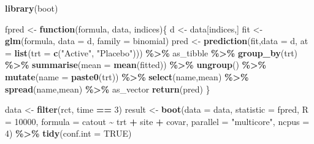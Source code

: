 \documentclass[
]{book}
\newenvironment{Shaded}{\begin{snugshade}}{\end{snugshade}}
\newcommand{\AttributeTok}[1]{\textcolor[rgb]{0.13,0.29,0.53}{#1}}
\newcommand{\ConstantTok}[1]{\textcolor[rgb]{0.56,0.35,0.01}{#1}}
\newcommand{\ControlFlowTok}[1]{\textcolor[rgb]{0.13,0.29,0.53}{\textbf{#1}}}
\newcommand{\DecValTok}[1]{\textcolor[rgb]{0.00,0.00,0.81}{#1}}
\newcommand{\FunctionTok}[1]{\textcolor[rgb]{0.13,0.29,0.53}{\textbf{#1}}}
\newcommand{\NormalTok}[1]{#1}
\newcommand{\OtherTok}[1]{\textcolor[rgb]{0.56,0.35,0.01}{#1}}
\newcommand{\SpecialCharTok}[1]{\textcolor[rgb]{0.81,0.36,0.00}{\textbf{#1}}}
\newcommand{\StringTok}[1]{\textcolor[rgb]{0.31,0.60,0.02}{#1}}
\begin{document}
\begin{Shaded}
\begin{Highlighting}[]
\FunctionTok{library}\NormalTok{(boot)}

\NormalTok{ fpred }\OtherTok{\textless{}{-}} \ControlFlowTok{function}\NormalTok{(formula, data, indices)\{}
\NormalTok{   d }\OtherTok{\textless{}{-}}\NormalTok{ data[indices,]}
\NormalTok{   fit }\OtherTok{\textless{}{-}} \FunctionTok{glm}\NormalTok{(formula, }\AttributeTok{data =}\NormalTok{ d, }\AttributeTok{family =}\NormalTok{ binomial)}
\NormalTok{   pred }\OtherTok{\textless{}{-}} \FunctionTok{prediction}\NormalTok{(fit,}\AttributeTok{data =}\NormalTok{ d, }\AttributeTok{at =} \FunctionTok{list}\NormalTok{(}\AttributeTok{trt =} \FunctionTok{c}\NormalTok{(}\StringTok{"Active"}\NormalTok{, }\StringTok{"Placebo"}\NormalTok{))) }\SpecialCharTok{\%\textgreater{}\%}
\NormalTok{     as\_tibble }\SpecialCharTok{\%\textgreater{}\%}
     \FunctionTok{group\_by}\NormalTok{(trt) }\SpecialCharTok{\%\textgreater{}\%}
     \FunctionTok{summarise}\NormalTok{(}\AttributeTok{mean =} \FunctionTok{mean}\NormalTok{(fitted)) }\SpecialCharTok{\%\textgreater{}\%}
     \FunctionTok{ungroup}\NormalTok{() }\SpecialCharTok{\%\textgreater{}\%}
     \FunctionTok{mutate}\NormalTok{(}\AttributeTok{name =} \FunctionTok{paste0}\NormalTok{(trt)) }\SpecialCharTok{\%\textgreater{}\%}
     \FunctionTok{select}\NormalTok{(name,mean) }\SpecialCharTok{\%\textgreater{}\%}
     \FunctionTok{spread}\NormalTok{(name,mean) }\SpecialCharTok{\%\textgreater{}\%}
\NormalTok{     as\_vector}
   \FunctionTok{return}\NormalTok{(pred)}
\NormalTok{ \}}
 
\NormalTok{ data }\OtherTok{\textless{}{-}} \FunctionTok{filter}\NormalTok{(rct, time }\SpecialCharTok{==} \DecValTok{3}\NormalTok{)}
\NormalTok{ result }\OtherTok{\textless{}{-}} \FunctionTok{boot}\NormalTok{(}\AttributeTok{data =}\NormalTok{ data, }
                \AttributeTok{statistic =}\NormalTok{ fpred, }
                \AttributeTok{R =} \DecValTok{10000}\NormalTok{, }
                \AttributeTok{formula =}\NormalTok{ catout }\SpecialCharTok{\textasciitilde{}}\NormalTok{ trt }\SpecialCharTok{+}\NormalTok{ site }\SpecialCharTok{+}\NormalTok{ covar,}
                \AttributeTok{parallel =} \StringTok{"multicore"}\NormalTok{,}
                \AttributeTok{ncpus =} \DecValTok{4}\NormalTok{) }\SpecialCharTok{\%\textgreater{}\%}
   \FunctionTok{tidy}\NormalTok{(}\AttributeTok{conf.int =} \ConstantTok{TRUE}\NormalTok{) }
\end{Highlighting}
\end{Shaded}
\end{document}
